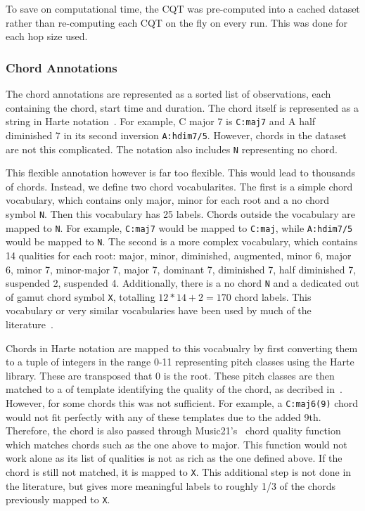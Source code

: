 To save on computational time, the CQT was pre-computed into a cached dataset rather than re-computing each CQT on the fly on every run. This was done for each hop size used.

\subsubsection{Chord Annotations}

The chord annotations are represented as a sorted list of observations, each containing the chord, start time and duration. The chord itself is represented as a string in Harte notation~\cite{HarteNotation}. For example, C major 7 is \texttt{C:maj7} and A half diminished 7 in its second inversion \texttt{A:hdim7/5}. However, chords in the dataset are not this complicated. The notation also includes \texttt{N} representing no chord.

This flexible annotation however is far too flexible. This would lead to thousands of chords. Instead, we define two chord vocabularites. The first is a simple chord vocabulary, which contains only major, minor for each root and a no chord symbol \texttt{N}. Then this vocabulary has 25 labels. Chords outside the vocabulary are mapped to \texttt{N}. For example, \texttt{C:maj7} would be mapped to \texttt{C:maj}, while \texttt{A:hdim7/5} would be mapped to \texttt{N}. The second is a more complex vocabulary, which contains 14 qualities for each root: major, minor, diminished, augmented, minor 6, major 6, minor 7, minor-major 7, major 7, dominant 7, diminished 7, half diminished 7, suspended 2, suspended 4. Additionally, there is a no chord \texttt{N} and a dedicated out of gamut chord symbol \texttt{X}, totalling $12*14 + 2 = 170$ chord labels. This vocabulary or very similar vocabularies have been used by much of the literature~\cite{StructuredTraining,FourTimelyInsights,ACRLargeVocab1}.

Chords in Harte notation are mapped to this vocabualry by first converting them to a tuple of integers in the range 0-11 representing pitch classes using the Harte library. These are transposed that 0 is the root. These pitch classes are then matched to a of template identifying the quality of the chord, as decribed in~\cite{StructuredTraining}. However, for some chords this was not sufficient. For example, a \texttt{C:maj6(9)} chord would not fit perfectly with any of these templates due to the added 9th. Therefore, the chord is also passed through Music21's~\cite{music21} chord quality function which matches chords such as the one above to major. This function would not work alone as its list of qualities is not as rich as the one defined above. If the chord is still not matched, it is mapped to \texttt{X}. This additional step is not done in the literature, but gives more meaningful labels to roughly 1/3 of the chords previously mapped to \texttt{X}.

